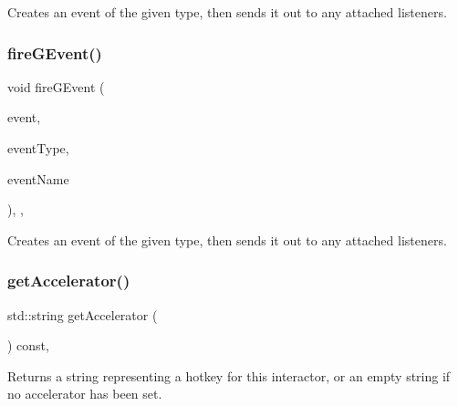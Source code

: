 Creates an event of the given type, then sends it out to any attached listeners. 

\mbox{\label{classsgl_1_1GObservable_a2a70a7d7435ff0c3b80bb4d70da19e0d}} 
\subsubsection{\texorpdfstring{fire\+G\+Event()}{fireGEvent()}\hspace{0.1cm}{\footnotesize\ttfamily [8/8]}}
{\footnotesize\ttfamily void fire\+G\+Event (\begin{DoxyParamCaption}\item[{Q\+Window\+State\+Change\+Event $\ast$}]{event,  }\item[{\mbox{\hyperlink{namespacesgl_a2628ea8d12e8b2563c32f05dc7fff6fa}{Event\+Type}}}]{event\+Type,  }\item[{const std\+::string \&}]{event\+Name }\end{DoxyParamCaption})\hspace{0.3cm}{\ttfamily [protected]}, {\ttfamily [virtual]}, {\ttfamily [inherited]}}



Creates an event of the given type, then sends it out to any attached listeners. 

\mbox{\label{classsgl_1_1GButton_a57806dc9defb73f76f493f8548319924}} 
\subsubsection{\texorpdfstring{get\+Accelerator()}{getAccelerator()}}
{\footnotesize\ttfamily std\+::string get\+Accelerator (\begin{DoxyParamCaption}{ }\end{DoxyParamCaption}) const\hspace{0.3cm}{\ttfamily [override]}, {\ttfamily [virtual]}}



Returns a string representing a hotkey for this interactor, or an empty string if no accelerator has been set. 

